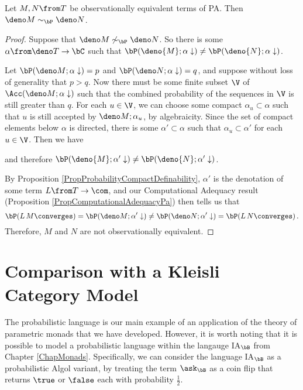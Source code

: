 \begin{theorem}
  Let $M,N \from T$ be observationally equivalent terms of PA.  
  Then $\deno M \sim_{\bP} \deno N$.
  \label{TheFullAbstractionPa}
\end{theorem}
\begin{proof}
  Suppose that $\deno M \not\sim_{\bP} \deno N$.
  So there is some $\alpha \from \deno T \to \bC$ such that $\bP(\deno{M};\alpha\downarrow) \ne \bP(\deno{N};\alpha\downarrow)$.

  Let $\bP(\deno M;\alpha\downarrow) = p$ and $\bP(\deno N;\alpha\downarrow) = q$, and suppose without loss of generality that $p>q$.
  Now there must be some finite subset $\V$ of $\Acc(\deno M;\alpha\downarrow)$ such that the combined probability of the sequences in $\V$ is still greater than $q$.  
  For each $u\in \V$, we can choose some compact $\alpha_u\subset \alpha$ such that $u$ is still accepted by $\deno M;\alpha_u$, by algebraicity.
  Since the set of compact elements below $\alpha$ is directed, there is some $\alpha'\subset \alpha$ such that $\alpha_u\subset \alpha'$ for each $u\in \V$.  
  Then we have
  and therefore $\bP(\deno{M};\alpha'\downarrow) \ne \bP(\deno{N};\alpha'\downarrow)$.

  By Proposition \ref{PropProbabilityCompactDefinability}, $\alpha'$ is the denotation of some term $L\from T \to \com$, and our Computational Adequacy result (Proposition \ref{PropComputationalAdequacyPa}) then tells us that 
  \[
    \bP(L\,M\converges)=\bP(\deno M;\alpha'\downarrow)\ne\bP(\deno N;\alpha'\downarrow) = \bP(L\,N\converges)\,.
    \]
  Therefore, $M$ and $N$ are not observationally equivalent.
\end{proof}

\section{Comparison with a Kleisli Category Model}

The probabilistic language is our main example of an application of the theory of parametric monads that we have developed.
However, it is worth noting that it is possible to model a probabilistic language within the langauge IA${}_\bB$ from Chapter \ref{ChapMonads}.
Specifically, we can consider the language IA${}_\bB$ as a probabilistic Algol variant, by treating the term $\ask_\bB$ as a coin flip that returns $\true$ or $\false$ each with probability $\frac12$.

